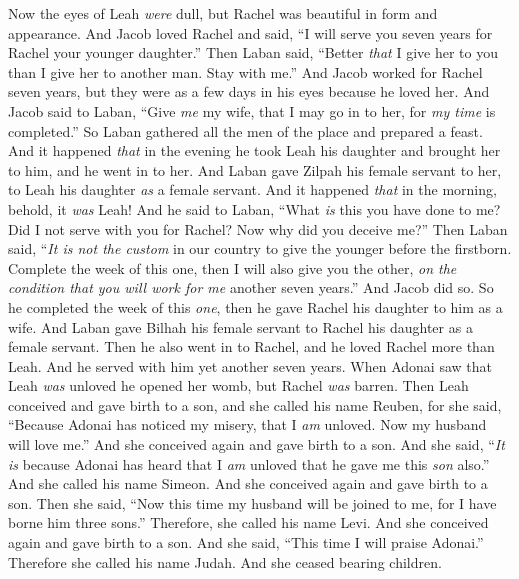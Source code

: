 \begin{biblechapter}
\verse Now the eyes of Leah \textit{were} dull, but Rachel was beautiful in form and appearance.
\verse And Jacob loved Rachel and said, “I will serve you seven years for Rachel your younger daughter.”
\verse Then Laban said, “Better \textit{that} I give her to you than I give her to another man. Stay with me.”
\verse And Jacob worked for Rachel seven years, but they were as a few days in his eyes because he loved her.
\verse And Jacob said to Laban, “Give \textit{me} my wife, that I may go in to her, for \textit{my time} is completed.”
\verse So Laban gathered all the men of the place and prepared a feast.
\verse And it happened \textit{that} in the evening he took Leah his daughter and brought her to him, and he went in to her.
\verse And Laban gave Zilpah his female servant to her, to Leah his daughter \textit{as} a female servant.
\verse And it happened \textit{that} in the morning, behold, it \textit{was} Leah! And he said to Laban, “What \textit{is} this you have done to me? Did I not serve with you for Rachel? Now why did you deceive me?”
\verse Then Laban said, “\textit{It is not the custom} in our country to give the younger before the firstborn.
\verse Complete the week of this one, then I will also give you the other, \textit{on the condition that you will work for me} another seven years.”
\verse And Jacob did so. So he completed the week of this \textit{one}, then he gave Rachel his daughter to him as a wife.
\verse And Laban gave Bilhah his female servant to Rachel his daughter as a female servant.
\verse Then he also went in to Rachel, and he loved Rachel more than Leah. And he served with him yet another seven years.
 When Adonai saw that Leah \textit{was} unloved he opened her womb, but Rachel \textit{was} barren.
\verse Then Leah conceived and gave birth to a son, and she called his name Reuben, for she said, “Because Adonai has noticed my misery, that I \textit{am} unloved. Now my husband will love me.”
\verse And she conceived again and gave birth to a son. And she said, “\textit{It is} because Adonai has heard that I \textit{am} unloved that he gave me this \textit{son} also.” And she called his name Simeon.
\verse And she conceived again and gave birth to a son. Then she said, “Now this time my husband will be joined to me, for I have borne him three sons.” Therefore, she called his name Levi.
\verse And she conceived again and gave birth to a son. And she said, “This time I will praise Adonai.” Therefore she called his name Judah. And she ceased bearing children.
\end{biblechapter}

